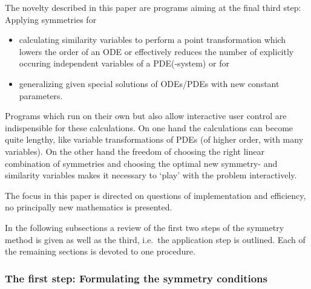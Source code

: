 The novelty described in this paper are programs aiming at
the final third step: Applying symmetries for
\begin{itemize}
\item calculating similarity variables to perform a point transformation
which lowers the order of an ODE or effectively reduces the number of
explicitly occuring independent variables of a PDE(-system) or for
\item generalizing given special solutions of ODEs/PDEs with new constant
parameters.
\end{itemize}
Programs which run on their own but also allow interactive user control
are indispensible for these calculations. On one hand the calculations can
become quite lengthy, like variable transformations of PDEs (of higher order,
with many variables). On the other hand the freedom of choosing the right
linear combination of symmetries and choosing the optimal new symmetry- and
similarity variables makes it necessary to `play' with the problem
interactively.

The focus in this paper is directed on questions of implementation and
efficiency, no principally new mathematics is presented.

In the following subsections a review of the first two steps of the symmetry
method is given as well as the third, i.e.\ the application step is outlined.
Each of the remaining sections is devoted to one procedure.
\subsubsection{The first step: Formulating the symmetry conditions}

